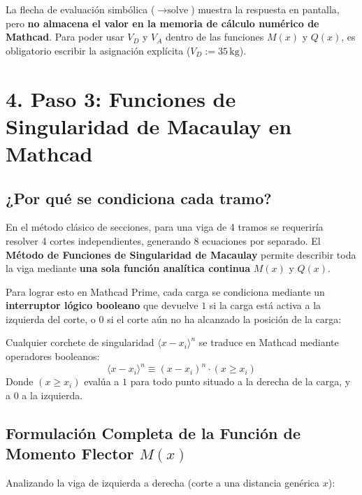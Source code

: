 \documentclass[10pt,a4paper]{article}
\begin{document}
\begin{tipbox}[¿Por qué asignar $V_D := 35\,\text{kg}$ después del solve?]
La flecha de evaluación simbólica ($\rightarrow \text{solve}$) muestra la respuesta en pantalla, pero \textbf{no almacena el valor en la memoria de cálculo numérico de Mathcad}. Para poder usar $V_D$ y $V_A$ dentro de las funciones $M(x)$ y $Q(x)$, es obligatorio escribir la asignación explícita ($V_D := 35\,\text{kg}$).
\end{tipbox}

\vspace{6pt}

\section{\color{NavyBlue}4. Paso 3: Funciones de Singularidad de Macaulay en Mathcad}

\subsection{¿Por qué se condiciona cada tramo?}
En el método clásico de secciones, para una viga de 4 tramos se requeriría resolver 4 cortes independientes, generando 8 ecuaciones por separado. El \textbf{Método de Funciones de Singularidad de Macaulay} permite describir toda la viga mediante \textbf{una sola función analítica continua} $M(x)$ y $Q(x)$.

Para lograr esto en Mathcad Prime, cada carga se condiciona mediante un \textbf{interruptor lógico booleano} que devuelve $1$ si la carga está activa a la izquierda del corte, o $0$ si el corte aún no ha alcanzado la posición de la carga:

\begin{formulaalert}
Cualquier corchete de singularidad $\langle x - x_i \rangle^n$ se traduce en Mathcad mediante operadores booleanos:
\[
\langle x - x_i \rangle^n \equiv (x - x_i)^n \cdot (x \ge x_i)
\]
Donde $(x \ge x_i)$ evalúa a $1$ para todo punto situado a la derecha de la carga, y a $0$ a la izquierda.
\end{formulaalert}

\subsection{Formulación Completa de la Función de Momento Flector $M(x)$}
Analizando la viga de izquierda a derecha (corte a una distancia genérica $x$):
\end{document}
